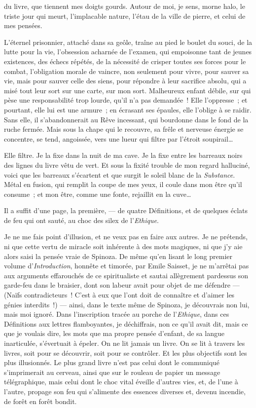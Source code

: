 \quebra

\noindent{}du livre,
que tiennent mes doigts gourds. Autour de moi, je sens, morne halo, le
triste jour qui meurt, l'implacable nature, l'étau de la ville de
pierre, et celui de mes pensées.

L'éternel prisonnier, attaché dans sa geôle, traîne au pied le boulet du
souci, de la lutte pour la vie, l'obsession acharnée de l'examen, qui
empoisonne tant de jeunes existences, des échecs répétés, de la
nécessité de crisper toutes ses forces pour le combat, l'obligation
morale de vaincre, non seulement pour vivre, pour sauver sa vie, mais
pour sauver celle des siens, pour répondre à leur sacrifice absolu, qui
a misé tout leur sort sur une carte, sur mon sort. Malheureux enfant
débile, sur qui pèse une responsabilité trop lourde, qu'il n'a pas
demandée~! Elle l'oppresse~; et pourtant, elle lui est une armure~; en
écrasant ses épaules, elle l'oblige à se raidir. Sans elle, il
s'abandonnerait au Rêve incessant, qui bourdonne dans le fond de la
ruche fermée. Mais sous la chape qui le recouvre, sa frêle et nerveuse
énergie se concentre, se tend, angoissée, vers une lueur qui filtre par
l'étroit soupirail\ldots{}

\quebra

Elle filtre. Je la fixe dans la nuit de ma cave. Je la fixe entre les
barreaux noirs des lignes du livre vêtu de vert. Et sous la fixité
trouble de mon regard halluciné, voici que les barreaux s'écartent et
que surgit le soleil blanc de la \emph{Substance}. Métal en fusion, qui
remplit la coupe de mes yeux, il coule dans mon être qu'il consume~; et
mon être, comme une fonte, rejaillit en la cuve\ldots{}

Il a suffit d'une page, la première, --- de quatre Définitions, et de
quelques éclats de feu qui ont sauté, au choc des silex de
l'\emph{Ethique}.

Je ne me fais point d'illusion, et ne veux pas en faire aux autres. Je
ne prétends, ni que cette vertu de miracle soit inhérente à des mots
magiques, ni que j'y aie alors saisi la pensée vraie de Spinoza. De même
qu'en lisant le long premier volume d'\emph{Introduction}, honnête et
timorée, par Emile Saisset, je ne m'arrêtai pas aux arguments
effarouchés de ce spiritualiste et sautai allègrement pardessus son
garde-feu dans le braisier, dont son labeur avait pour objet de me
défendre --- (Naïfs contradicteurs~! C'est à eux que l'ont doit de
connaître et d'aimer les génies interdits~!) --- ainsi, dans le texte
même de Spinoza, je découvrais non lui, mais moi ignoré. Dans
l'inscription tracée au porche de l'\emph{Ethique}, dans ces Définitions
aux lettres flamboyantes, je déchiffrais, non ce qu'il avait dit, mais
ce que je voulais dire, les mots que ma propre pensée d'enfant, de sa
langue inarticulée, s'évertuait à épeler. On ne lit jamais un livre. On
se lit à travers les livres, soit pour se découvrir, soit pour se
contrôler. Et les plus objectifs sont les plus illusionnés. Le plus
grand livre n'est pas celui dont le communiqué s'imprimerait au cerveau,
ainsi que sur le rouleau de papier un message télégraphique, mais celui
dont le choc vital éveille d'autres vies, et, de l'une à l'autre,
propage son feu qui s'alimente des essences diverses et, devenu
incendie, de forêt en forêt bondit.

